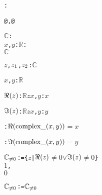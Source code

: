 \begin{alltt}
: 

   @, @

  \(\mathbb{C}\): 
    \pvsid{(}\(x\), \(y\): \(\mathbb{R}\)\vspace*{\pvsdeclspacing}\pvsid{)}: 
    \(\mathbb{C}\)

  \(z\), \(z\sb{1}\), \(z\sb{2}\):  \(\mathbb{C}\)\vspace*{\pvsdeclspacing}

  \(x\), \(y\):  \(\mathbb{R}\)\vspace*{\pvsdeclspacing}

  \(\Reonefn{z}\): \(\mathbb{R}\) \pvskey{=}  \(z\)  \pvsid{(}\(x\), \(y\)\pvsid{)}: \(x\) \vspace*{\pvsdeclspacing}

  \(\Imonefn{z}\): \(\mathbb{R}\) \pvskey{=}  \(z\)  \pvsid{(}\(x\), \(y\)\pvsid{)}: \(y\) \vspace*{\pvsdeclspacing}

  :  \(\Reonefn{\pvsid{complex\_}\pvsid{(}x, y\pvsid{)}}\) \(=\) \(x\)\vspace*{\pvsdeclspacing}

  :  \(\Imonefn{\pvsid{complex\_}\pvsid{(}x, y\pvsid{)}}\) \(=\) \(y\)\vspace*{\pvsdeclspacing}

   


   


  \({\pvssubscript{\mathbb{C}}{{\not=}0}}\):  = \{\(z\) | \(\Reonefn{z}\) \(\neq\) \(0\) \(\vee\) \(\Imonefn{z}\) \(\neq\) \(0\)\}  
                                                                       \pvsid{(}\(1\),
                                                                         \(0\)\pvsid{)}\vspace*{\pvsdeclspacing}

  \({\pvssubscript{\mathbb{C}}{{\not=}0}}\):  = \({\pvssubscript{\mathbb{C}}{{\not=}0}}\)\vspace*{\pvsdeclspacing}


\end{alltt}

